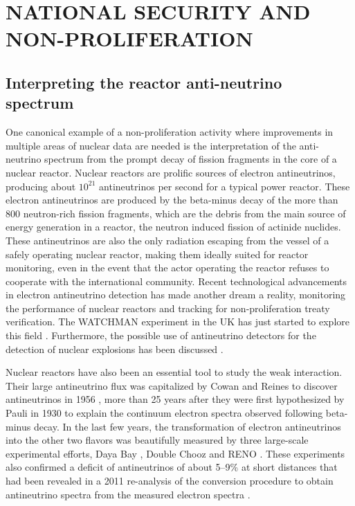 \documentclass[letterpaper]{ar-1col}
\begin{document}
\section{NATIONAL SECURITY AND NON-PROLIFERATION}

\subsection{Interpreting the reactor anti-neutrino spectrum}

One canonical example of a non-proliferation activity where improvements in multiple areas of nuclear data are needed is the interpretation of the anti-neutrino spectrum from the prompt decay of fission fragments in the core of a nuclear reactor.
Nuclear reactors are prolific sources of electron antineutrinos, producing about $10^{21}$ antineutrinos per second for a typical power reactor.
 These electron antineutrinos are produced by the beta-minus decay of the more than 800 neutron-rich fission fragments, which are the debris from the main source of energy generation in a reactor, the neutron induced fission of actinide nuclides.
 These antineutrinos are also the only radiation escaping from the vessel of a safely operating nuclear reactor, making them ideally suited for reactor monitoring, even in the event that the actor operating the reactor refuses to cooperate with the international community.
 Recent technological advancements in electron antineutrino detection has made another dream a reality, monitoring the performance of nuclear reactors and tracking  for non-proliferation treaty verification.
  The WATCHMAN experiment in the UK has just started to explore this field \cite{Cha18}.
 Furthermore, the possible use of antineutrino detectors for the detection of nuclear explosions has been discussed \cite{CarAx}.
 
Nuclear reactors have also been an essential tool to study the weak interaction.
 Their large antineutrino flux was capitalized by Cowan and Reines to discover antineutrinos in 1956 \cite{Cow56}, more than 25 years after they were first hypothesized by Pauli in 1930 to explain the continuum electron spectra observed following beta-minus decay.
  In the last few years, the transformation of electron antineutrinos into the other two flavors was beautifully measured by three large-scale experimental efforts, Daya Bay \cite{An16}, Double Chooz \cite{Abe12} and RENO \cite{Cho16}.
  These experiments also confirmed a deficit of antineutrinos of about 5--9\% at short distances that had been revealed in a 2011 re-analysis of the conversion procedure to obtain antineutrino spectra from the measured electron spectra \cite{Men11}.
\end{document}
